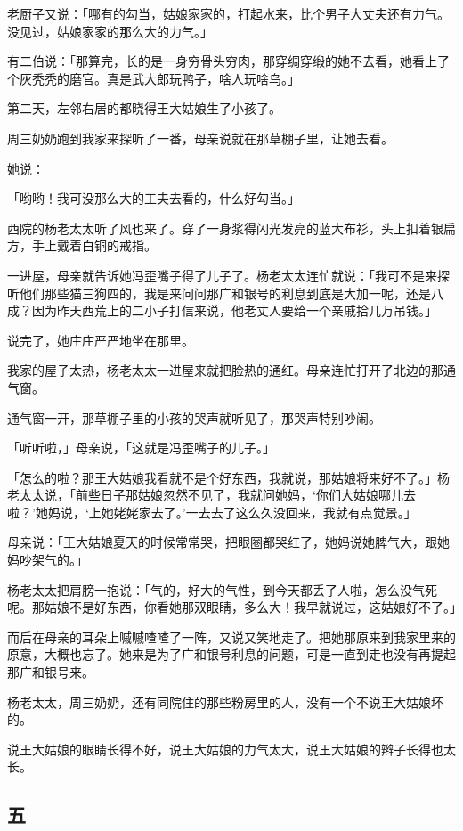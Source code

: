 \documentclass[UTF8]{ctexart}
\begin{document}
老厨子又说：「哪有的勾当，姑娘家家的，打起水来，比个男子大丈夫还有力气。没见过，姑娘家家的那么大的力气。」

有二伯说：「那算完，长的是一身穷骨头穷肉，那穿绸穿缎的她不去看，她看上了个灰秃秃的磨官。真是武大郎玩鸭子，啥人玩啥鸟。」

第二天，左邻右居的都晓得王大姑娘生了小孩了。

周三奶奶跑到我家来探听了一番，母亲说就在那草棚子里，让她去看。

她说：

「哟哟！我可没那么大的工夫去看的，什么好勾当。」

西院的杨老太太听了风也来了。穿了一身浆得闪光发亮的蓝大布衫，头上扣着银扁方，手上戴着白铜的戒指。

一进屋，母亲就告诉她冯歪嘴子得了儿子了。杨老太太连忙就说：「我可不是来探听他们那些猫三狗四的，我是来问问那广和银号的利息到底是大加一呢，还是八成？因为昨天西荒上的二小子打信来说，他老丈人要给一个亲戚拾几万吊钱。」

说完了，她庄庄严严地坐在那里。

我家的屋子太热，杨老太太一进屋来就把脸热的通红。母亲连忙打开了北边的那通气窗。

通气窗一开，那草棚子里的小孩的哭声就听见了，那哭声特别吵闹。

「听听啦，」母亲说，「这就是冯歪嘴子的儿子。」

「怎么的啦？那王大姑娘我看就不是个好东西，我就说，那姑娘将来好不了。」杨老太太说，「前些日子那姑娘忽然不见了，我就问她妈，‘你们大姑娘哪儿去啦？’她妈说，‘上她姥姥家去了。’一去去了这么久没回来，我就有点觉景。」

母亲说：「王大姑娘夏天的时候常常哭，把眼圈都哭红了，她妈说她脾气大，跟她妈吵架气的。」

杨老太太把肩膀一抱说：「气的，好大的气性，到今天都丢了人啦，怎么没气死呢。那姑娘不是好东西，你看她那双眼睛，多么大！我早就说过，这姑娘好不了。」

而后在母亲的耳朵上嘁嘁喳喳了一阵，又说又笑地走了。把她那原来到我家里来的原意，大概也忘了。她来是为了广和银号利息的问题，可是一直到走也没有再提起那广和银号来。

杨老太太，周三奶奶，还有同院住的那些粉房里的人，没有一个不说王大姑娘坏的。

说王大姑娘的眼睛长得不好，说王大姑娘的力气太大，说王大姑娘的辫子长得也太长。

\subsection{五}
\end{document}
